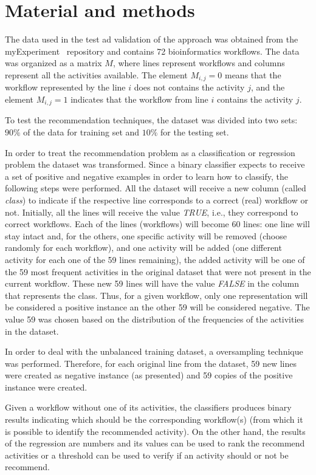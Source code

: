 \documentclass{sig-alternate-05-2015}
\begin{document}
\section{Material and methods}\label{METODOLOGIA}
The data used in the test ad validation of the approach was obtained from the myExperiment~\cite{ROURE2015} repository  and contains 72 bioinformatics workflows. The data was organized as a matrix \(M\), where lines represent workflows and columns represent all the activities available. The element \(M_{i, j} = 0\) means that the workflow represented by the line \(i\) does not contains the activity \(j\), and the element \(M_ {i, j} = 1\) indicates that the workflow from line \(i\) contains the activity \(j\).

To test the recommendation techniques, the dataset was divided into two sets: \(90\%\) of the data for training set and \(10\%\) for the testing set.

In  order to treat the recommendation problem as a classification or regression problem the dataset was transformed. Since a binary classifier expects to receive a set of positive and negative examples in order to learn how to classify, the following steps were performed. All the dataset will receive a new column (called \emph{class}) to indicate if the respective line corresponds to a correct (real) workflow or not. Initially, all the lines will receive the value \emph{TRUE}, i.e., they correspond to correct workflows. Each of the lines (workflows) will become 60 lines: one line will stay intact and, for the others, one specific activity will be removed (choose randomly for each workflow), and one activity will be added (one different activity for each one of the 59 lines remaining), the added activity will be one of the 59 most frequent activities in the original dataset that were not present in the current workflow. These new 59 lines will have the value \emph{FALSE} in the column that represents the class. Thus, for a given workflow, only one representation will be considered a positive instance an the other 59 will be considered negative. The value 59 was chosen based on the distribution of the frequencies of the activities in the dataset. 

In order to deal with the unbalanced training dataset, a oversampling technique was performed. Therefore, for each original line from the dataset, 59 new lines were created as negative instance (as presented) and 59 copies of the positive instance were created.

Given a workflow without one of its activities, the classifiers produces binary results indicating which should be the corresponding workflow(s) (from which it is possible to identify the recommended activity). On the other hand, the results of the regression are numbers and its values can be used to rank the recommend activities or a threshold can be used to verify if an activity should or not be recommend.
\end{document}
